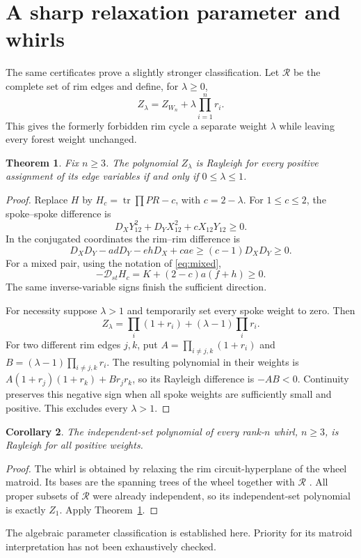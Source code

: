 \documentclass[11pt]{article}
\newtheorem{theorem}{Theorem}
\newtheorem{corollary}[theorem]{Corollary}
\newcommand{\tr}{\operatorname{tr}}
\newcommand{\Del}{\mathcal D}
\begin{document}
\section{A sharp relaxation parameter and whirls}
The same certificates prove a slightly stronger classification. Let $\mathcal R$ be the complete set of rim edges and define, for $\lambda\ge0$,
\[
 Z_\lambda=Z_{W_n}+\lambda\prod_{i=1}^n r_i.
\]
This gives the formerly forbidden rim cycle a separate weight $\lambda$ while leaving every forest weight unchanged.

\begin{theorem}\label{thm:parameter}
Fix $n\ge3$. The polynomial $Z_\lambda$ is Rayleigh for every positive assignment of its edge variables if and only if $0\le\lambda\le1$.
\end{theorem}
\begin{proof}
Replace $H$ by $H_c=\tr\prod PR-c$, with $c=2-\lambda$. For $1\le c\le2$, the spoke--spoke difference is
\[
 D_XY_{12}^2+D_YX_{12}^2+cX_{12}Y_{12}\ge0.
\]
In the conjugated coordinates the rim--rim difference is
\[
 D_XD_Y-adD_Y-ehD_X+cae\ge(c-1)D_XD_Y\ge0.
\]
For a mixed pair, using the notation of \eqref{eq:mixed},
\[
 -\Del_{st}H_c=K+(2-c)a(f+h)\ge0.
\]
The same inverse-variable signs finish the sufficient direction.

For necessity suppose $\lambda>1$ and temporarily set every spoke weight to zero. Then
\[
 Z_\lambda=\prod_i(1+r_i)+(\lambda-1)\prod_i r_i.
\]
For two different rim edges $j,k$, put $A=\prod_{i\ne j,k}(1+r_i)$ and $B=(\lambda-1)\prod_{i\ne j,k}r_i$. The resulting polynomial in their weights is $A(1+r_j)(1+r_k)+Br_jr_k$, so its Rayleigh difference is $-AB<0$. Continuity preserves this negative sign when all spoke weights are sufficiently small and positive. This excludes every $\lambda>1$.
\end{proof}

\begin{corollary}
The independent-set polynomial of every rank-$n$ whirl, $n\ge3$, is Rayleigh for all positive weights.
\end{corollary}
\begin{proof}
The whirl is obtained by relaxing the rim circuit-hyperplane of the wheel matroid. Its bases are the spanning trees of the wheel together with $\mathcal R$ \cite{DSW}. All proper subsets of $\mathcal R$ were already independent, so its independent-set polynomial is exactly $Z_1$. Apply Theorem~\ref{thm:parameter}.
\end{proof}
The algebraic parameter classification is established here. Priority for its matroid interpretation has not been exhaustively checked.
\end{document}
